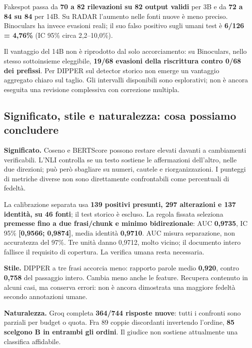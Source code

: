 \documentclass[10pt,a4paper]{article}
\begin{document}
Fakespot passa da \textbf{70 a 82 rilevazioni su 82 output validi} per 3B e da \textbf{72 a 84 su 84} per 14B. Su RADAR l'aumento nelle fonti nuove è meno preciso. Binoculars ha invece evasioni reali; il suo falso positivo sugli umani test è \textbf{6/126 = 4,76\%} (IC 95\% circa 2,2--10,0\%).

Il vantaggio del 14B non è riprodotto dal solo accorciamento: su Binoculars, nello stesso sottoinsieme eleggibile, \textbf{19/68 evasioni della riscrittura contro 0/68 dei prefissi}. Per DIPPER sul detector storico non emerge un vantaggio aggregato chiaro sul taglio. Gli intervalli disponibili sono esplorativi; non è ancora eseguita una revisione complessiva con correzione multipla.

\newpage

\subsection{Significato, stile e naturalezza: cosa possiamo concludere}\label{significato-stile-e-naturalezza-cosa-possiamo-concludere}

\textbf{Significato.} Coseno e BERTScore possono restare elevati davanti a cambiamenti verificabili. L'NLI controlla se un testo sostiene le affermazioni dell'altro, nelle due direzioni; può però sbagliare su numeri, cautele e riorganizzazioni. I punteggi di metriche diverse non sono direttamente confrontabili come percentuali di fedeltà.

La calibrazione separata usa \textbf{139 positivi presunti, 297 alterazioni e 137 identità, su 46 fonti}; il test storico è escluso. La regola fissata seleziona \textbf{premesse fino a due frasi/chunk e minimo bidirezionale}: AUC \textbf{0,9735}, IC 95\% \textbf{{[}0,9566; 0,9874{]}}, media identità \textbf{0,9710}. AUC misura separazione, non accuratezza del 97\%. Tre unità danno 0,9712, molto vicino; il documento intero fallisce il requisito di copertura. La verifica umana resta necessaria.

\textbf{Stile.} DIPPER a tre frasi accorcia meno: rapporto parole medio \textbf{0,920}, contro \textbf{0,758} del passaggio intero. Cambia meno anche le feature. Recupera contenuto in alcuni casi, ma conserva errori: non è ancora dimostrata una maggiore fedeltà secondo annotazioni umane.

\textbf{Naturalezza.} Groq completa \textbf{364/744 risposte nuove}: tutti i confronti sono parziali per budget o quota. Fra 89 coppie discordanti invertendo l'ordine, \textbf{85 scelgono B in entrambi gli ordini}. Il giudice non sostiene attualmente una classifica affidabile.
\end{document}

